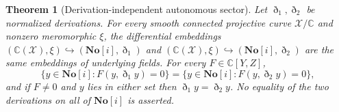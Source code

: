 \documentclass[11pt,letterpaper]{article}
\numberwithin{equation}{section}
\newtheorem{theorem}{Theorem}[section]
\theoremstyle{definition}
\theoremstyle{remark}
\newcommand{\SC}{\mathbf{No}[i]}
\newcommand{\C}{\mathbb C}
\newcommand{\Dn}{\eth}
\begin{document}
\begin{theorem}[Derivation-independent autonomous sector]
\label{diff:aut:thm:independence}
Let $\Dn_{1},\Dn_{2}$ be normalized derivations. For every smooth connected
projective curve $\mathcal X/\C$ and nonzero meromorphic $\xi$, the differential
embeddings $(\C(\mathcal X),\xi)\hookrightarrow(\SC,\Dn_{1})$ and
$(\C(\mathcal X),\xi)\hookrightarrow(\SC,\Dn_{2})$ are the same embeddings of
underlying fields. For every $F\in\C[Y,Z]$,
\begin{equation}\label{diff:aut:eq:independence}
 \{y\in\SC:F(y,\Dn_{1}y)=0\}=\{y\in\SC:F(y,\Dn_{2}y)=0\},
\end{equation}
and if $F\neq0$ and $y$ lies in either set then $\Dn_{1}y=\Dn_{2}y$. No equality
of the two derivations on all of $\SC$ is asserted.
\end{theorem}
\end{document}
